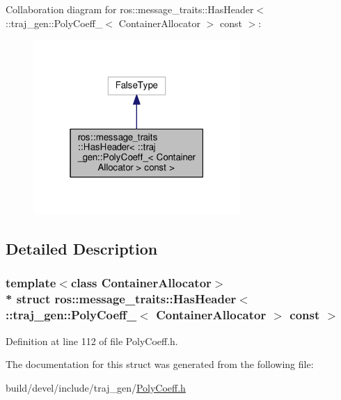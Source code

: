 Collaboration diagram for ros\+:\+:message\+\_\+traits\+:\+:Has\+Header$<$ \+:\+:traj\+\_\+gen\+:\+:Poly\+Coeff\+\_\+$<$ Container\+Allocator $>$ const $>$\+:
\nopagebreak
\begin{figure}[H]
\begin{center}
\leavevmode
\includegraphics[width=223pt]{structros_1_1message__traits_1_1_has_header_3_01_1_1traj__gen_1_1_poly_coeff___3_01_container_alf58f4fe6cc8fa03dbaec520fad4b5243}
\end{center}
\end{figure}


\subsection{Detailed Description}
\subsubsection*{template$<$class Container\+Allocator$>$\\*
struct ros\+::message\+\_\+traits\+::\+Has\+Header$<$ \+::traj\+\_\+gen\+::\+Poly\+Coeff\+\_\+$<$ Container\+Allocator $>$ const  $>$}



Definition at line 112 of file Poly\+Coeff.\+h.



The documentation for this struct was generated from the following file\+:\begin{DoxyCompactItemize}
\item 
build/devel/include/traj\+\_\+gen/\hyperlink{_poly_coeff_8h}{Poly\+Coeff.\+h}\end{DoxyCompactItemize}
